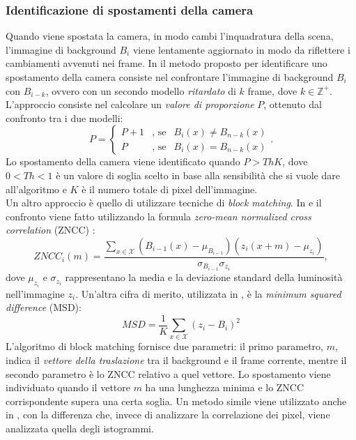 \subsubsection{Identificazione di spostamenti della camera}
Quando viene spostata la camera, in modo cambi l'inquadratura della scena, l'immagine di background $B_i$ viene lentamente aggiornato in modo da riflettere i cambiamenti avvenuti nei frame. 
In \cite{saglam2009real} il metodo proposto per identificare uno spostamento della camera consiste nel confrontare l'immagine di background $B_i$ con $B_{i-k}$, ovvero con un secondo modello \textit{ritardato} di $k$ frame, dove $k \in \mathbb{Z}^+$.
L'approccio consiste nel calcolare un \textit{valore di proporzione} $P$, ottenuto dal confronto tra i due modelli:
\begin{equation}
\label{eq:displEqSaglam}
P=\left\{ \begin{array} {lcl}
P+1 & \mbox{, se} & B_i(x) \neq B_{n-k}(x) \\
P & \mbox{, se} & B_i(x) = B_{n-k}(x) \end{array} \right. .
\end{equation}
Lo spostamento della camera viene identificato quando $P > Th K$, dove $0<Th<1$ \`e un valore di soglia scelto in base alla sensibilit\`a che si vuole dare all'algoritmo e $K$ \`e il numero totale di pixel dell'immagine.\\
Un altro approccio \`e quello di utilizzare tecniche di \textit{block matching}.
In \cite{gil2007automatic} e \cite{harasse2004automated} il confronto viene fatto utilizzando la formula \textit{zero-mean normalized cross correlation} (ZNCC) \cite{roma2002comparative}:
\begin{equation}
ZNCC_i(m) = \frac{\sum_{x \in \mathcal{X}}(B_{i-1}(x)- \mu_{B_{i-1}})(z_i(x+m)-\mu_{z_i})}{\sigma_{B_{i-1}} \sigma_{z_i}},
\end{equation} 
dove $\mu_{z_i}$ e $\sigma_{z_i}$ rappresentano la media e la deviazione standard della luminosit\`a nell'immagine $z_i$.
Un'altra cifra di merito, utilizzata in \cite{ellwart2012camera}, \`e la \textit{minimum squared difference} (MSD):
\begin{equation}
MSD = \frac{1}{K}\sum_{x \in \mathcal{X}}(z_i - B_i)^2
\end{equation}
L'algoritmo di block matching fornisce due parametri:
il primo parametro, $m$, indica il \textit{vettore della traslazione} tra il background e il frame corrente, mentre il secondo parametro \`e lo ZNCC relativo a quel vettore.
Lo spostamento viene individuato quando il vettore $m$ ha una lunghezza minima e lo ZNCC corrispondente supera una certa soglia.
Un metodo simile viene utilizzato anche in \cite{kryjak2012fpga}, con la differenza che, invece di analizzare la correlazione dei pixel, viene analizzata quella degli istogrammi. 
